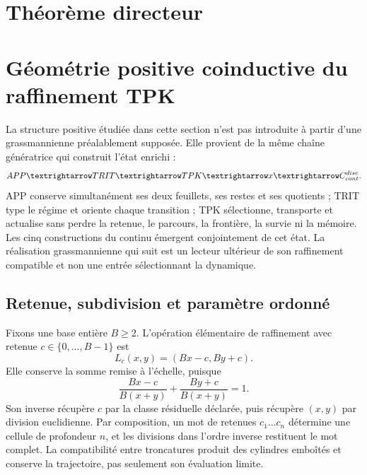 \section{Théorème directeur}


\section{Géométrie positive coinductive du raffinement TPK}
\label{geometria_positiva:sec:geom-positiva-tpk}

La structure positive étudiée dans cette section n’est pas introduite à partir d’une grassmannienne préalablement supposée. Elle provient de la même chaîne génératrice qui construit l’état enrichi :
\[
 \APP\longrightarrow\mathrm{TRIT}\longrightarrow\TPK
 \longrightarrow \widehat x
 \longrightarrow\mathcal C_{\rm cont}^{\rm disc}.
\]
APP conserve simultanément ses deux feuillets, ses restes et ses quotients ; TRIT type le régime et oriente chaque transition ; TPK sélectionne, transporte et actualise sans perdre la retenue, le parcours, la frontière, la survie ni la mémoire. Les cinq constructions du continu émergent conjointement de cet état. La réalisation grassmannienne qui suit est un lecteur ultérieur de son raffinement compatible et non une entrée sélectionnant la dynamique.

\subsection{Retenue, subdivision et paramètre ordonné}

Fixons une base entière \(B\ge2\). L’opération élémentaire de raffinement avec retenue \(c\in\{0,\ldots,B-1\}\) est
\begin{equation}
 L_c(x,y)=(Bx-c,By+c).
 \label{geometria_positiva:eq:carry-map-positive}
\end{equation}
Elle conserve la somme remise à l’échelle, puisque
\[
 \frac{Bx-c}{B(x+y)}+\frac{By+c}{B(x+y)}=1.
\]
Son inverse récupère \(c\) par la classe résiduelle déclarée, puis récupère \((x,y)\) par division euclidienne. Par composition, un mot de retenues \(c_1\ldots c_n\) détermine une cellule de profondeur \(n\), et les divisions dans l’ordre inverse restituent le mot complet. La compatibilité entre troncatures produit des cylindres emboîtés et conserve la trajectoire, pas seulement son évaluation limite.

